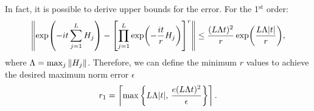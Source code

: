 \documentclass[a4paper]{report}
\begin{document}
\begin{spacing}{1.1}
In fact, it is possible to derive upper bounds for the error. For the 1$^{\text{st}}$ order:
\begin{align}
    \norm{\exp(-it \sum_{j=1}^L H_j) - \left[ \prod_{j=1}^L \exp(-\frac{it}{r} H_j) \right]^r } \leq \frac{(L\Lambda t)^2}{r}\exp(\frac{L\Lambda \abs{t}}{r}),
\end{align}
where $\Lambda = \max_j \norm{H_j}$. Therefore, we can define the minimum $r$ values to achieve the desired maximum norm error $\epsilon$
\begin{align}
    r_1 &= \left\lceil \max \left\{ L \Lambda \abs{t},\, \frac{e(L\Lambda t)^2}{\epsilon} \right\} \right\rceil.\\
\end{align}



\end{spacing}
\end{document}
